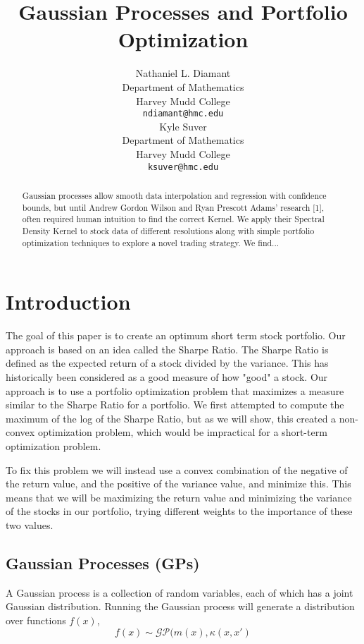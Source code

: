 \documentclass{article}
\title{Gaussian Processes and Portfolio Optimization}
\author{
  Nathaniel L. Diamant \\
  Department of Mathematics\\
  Harvey Mudd College\\
  \texttt{ndiamant@hmc.edu} \\
  \And Kyle Suver \\
  Department of Mathematics\\
  Harvey Mudd College\\
  \texttt{ksuver@hmc.edu} \\
}
\begin{document}
\maketitle

\begin{abstract}
  Gaussian processes allow smooth data interpolation and regression with confidence bounds, but until Andrew Gordon Wilson and Ryan Prescott Adams' research [1], often required human intuition to find the correct Kernel. We apply their Spectral Density Kernel to stock data of different resolutions along with simple portfolio optimization techniques to explore a novel trading strategy. We find...
\end{abstract}

\section{Introduction}
\label{intro}

The goal of this paper is to create an optimum short term stock portfolio.  Our approach is based on an idea called the Sharpe Ratio.  The Sharpe Ratio is defined as the expected return of a stock divided by the variance.  This has historically been considered as a good measure of how "good" a stock.  Our approach is to use a portfolio optimization problem that maximizes a measure similar to the Sharpe Ratio for a portfolio.  We first attempted to compute the maximum of the log of the Sharpe Ratio, but as we will show, this created a non-convex optimization problem, which would be impractical for a short-term optimization problem.  

To fix this problem we will instead use a convex combination of the negative of the return value, and the positive of the variance value, and minimize this.  This means that we will be maximizing the return value and minimizing the variance of the stocks in our portfolio, trying different weights to the importance of these two values.

\subsection{Gaussian Processes (GPs)}

A Gaussian process is a collection of random variables, each of which has a joint Gaussian distribution.  Running the Gaussian process will generate a distribution over functions $f(x)$,
\begin{equation}
	f(x) \sim \mathcal{GP}(m(x), \kappa(x, x')
    \label{eqn:GP}
\end{equation}
\end{document}
